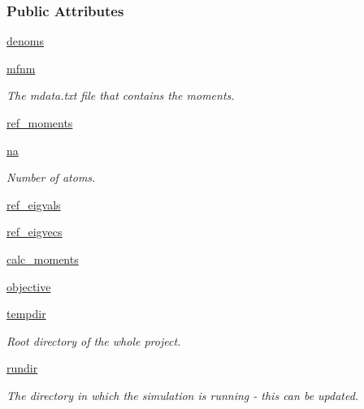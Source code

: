 \subsubsection*{\-Public \-Attributes}
\begin{DoxyCompactItemize}
\item 
\hyperlink{classforcebalance_1_1moments_1_1Moments_a10c5750909afd196478a2f81a3a9b1c6}{denoms}
\item 
\hyperlink{classforcebalance_1_1moments_1_1Moments_a2e2bdf0bfc8bb05017e9d6acbe6ce092}{mfnm}
\begin{DoxyCompactList}\small\item\em \-The mdata.\-txt file that contains the moments. \end{DoxyCompactList}\item 
\hyperlink{classforcebalance_1_1moments_1_1Moments_a34ef88133ccf7d1e506fee93a8a7c3a8}{ref\-\_\-moments}
\item 
\hyperlink{classforcebalance_1_1moments_1_1Moments_ab9bfae7a4fce1861d78b2a5a21d42adf}{na}
\begin{DoxyCompactList}\small\item\em \-Number of atoms. \end{DoxyCompactList}\item 
\hyperlink{classforcebalance_1_1moments_1_1Moments_a371530590d4aae59fd8c59cd297e7e9e}{ref\-\_\-eigvals}
\item 
\hyperlink{classforcebalance_1_1moments_1_1Moments_a44e515a9fce615d96f722fb274000f4a}{ref\-\_\-eigvecs}
\item 
\hyperlink{classforcebalance_1_1moments_1_1Moments_a567fb41f233e646142e2bfeb1901f7ce}{calc\-\_\-moments}
\item 
\hyperlink{classforcebalance_1_1moments_1_1Moments_a9a2f30bf784b3e9accaabed4e5451f37}{objective}
\item 
\hyperlink{classforcebalance_1_1target_1_1Target_aede2856573b890cd47054ad36937d6f6}{tempdir}
\begin{DoxyCompactList}\small\item\em \-Root directory of the whole project. \end{DoxyCompactList}\item 
\hyperlink{classforcebalance_1_1target_1_1Target_a1da470037ef61c22dc44beb85cfa01a9}{rundir}
\begin{DoxyCompactList}\small\item\em \-The directory in which the simulation is running -\/ this can be updated. \end{DoxyCompactList}\item 

\end{DoxyCompactItemize}
